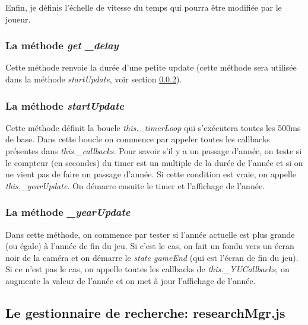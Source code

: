 \documentclass{article}
\begin{document}
		
		Enfin, je définis l'échelle de vitesse du temps qui pourra être modifiée par le joueur.
		
		\subsubsection{La méthode \textit{get \_delay}}
		Cette méthode renvoie la durée d'une petite update (cette méthode sera utilisée dans la méthode \textit{startUpdate}, voir section \ref{startUpdate}).
		
		\subsubsection{La méthode \textit{startUpdate}} \label{startUpdate}
		Cette méthode définit la boucle \textit{this.\_timerLoop} qui s'exécutera toutes les 500ms de base. Dans cette boucle on commence par appeler toutes les callbacks présentes dans \textit{this.\_callbacks}. 
		Pour savoir s'il y a un passage d'année, on teste si le compteur (en secondes) du timer est un multiple de la durée de l'année et si on ne vient pas de faire un passage d'année. Si cette condition est vraie, on appelle \textit{this.\_yearUpdate}.
		On démarre ensuite le timer et l'affichage de l'année.
		
		\subsubsection{La méthode \textit{\_yearUpdate}}
		Dans cette méthode,  on commence par tester si l'année actuelle est plus grande (ou égale) à l'année de fin du jeu. Si c'est le cas, on fait un fondu vers un écran noir de la caméra et on démarre le \textit{state gameEnd} (qui est l'écran de fin du jeu).
		Si ce n'est pas le cas, on appelle toutes les callbacks de \textit{this.\_YUCallbacks}, on augmente la valeur de l'année et on met à jour l'affichage de l'année.
		
		\subsection{Le gestionnaire de recherche: researchMgr.js} \label{researchMgr}
		
		
\end{document}
